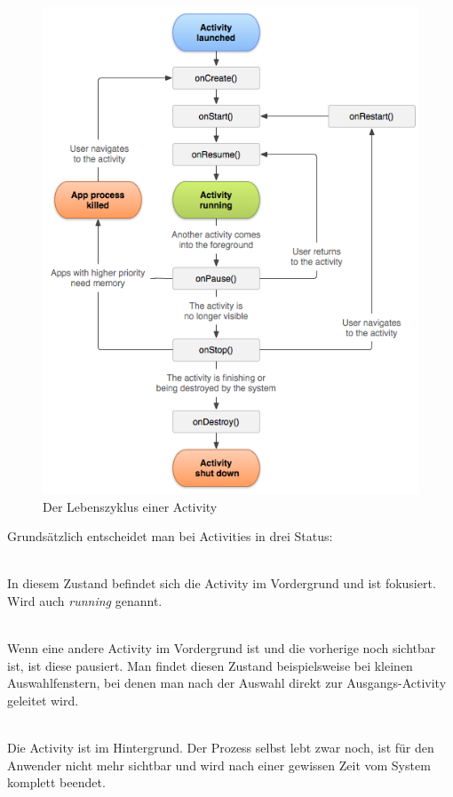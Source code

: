 \begin{figure}[ht!]
\begin{center}
\includegraphics[scale=.6]{images/activity_lifecycle}
\caption{Der Lebenszyklus einer Activity}
\label{lifecycle}
\end{center}
\end{figure}

Grundsätzlich entscheidet man bei Activities in drei Status:

\begin{description}[style=nextline]

	\item[Resumed] \hfill \\
	In diesem Zustand befindet sich die Activity im Vordergrund und ist fokusiert. Wird auch \emph{running} genannt.
	
	\item[Paused] \hfill \\
	Wenn eine andere Activity im Vordergrund ist und die vorherige noch sichtbar ist, ist diese pausiert. Man findet diesen Zustand beispielsweise bei kleinen Auswahlfenstern, bei denen man nach der Auswahl direkt  zur Ausgangs-Activity geleitet wird.
	
	\item[Stopped] \hfill \\
	Die Activity ist im Hintergrund. Der Prozess selbst lebt zwar noch, ist für den Anwender nicht mehr sichtbar und wird nach einer gewissen Zeit vom System komplett beendet.
	
\end{description}

